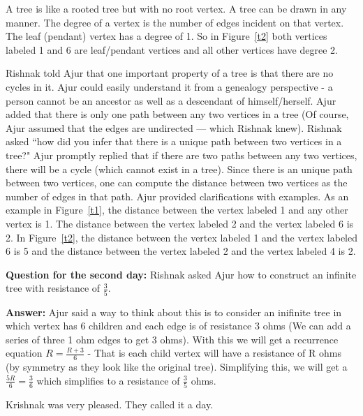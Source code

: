 A tree is like a rooted tree but with no root vertex. A tree can be drawn in any manner. The degree of a vertex is the number of edges incident on that vertex. The leaf (pendant) vertex has a degree of 1. So in Figure~\ref{t2} both vertices labeled 1 and 6 are leaf/pendant vertices and all other vertices have degree 2. 

Rishnak told Ajur that one important property of a tree is that there are no cycles in it. Ajur could easily understand it from a genealogy perspective - a person cannot be an ancestor as well as a descendant of himself/herself.  Ajur added that there is only one path between any two vertices in a tree (Of course, Ajur assumed that the edges are undirected --- which Rishnak knew). Rishnak asked ``how did you infer that there is a unique path between two vertices in a tree?" Ajur promptly replied that if there are two paths between any two vertices, there will be a cycle (which cannot exist in a tree). Since there is an unique path between two vertices, one can compute the distance between two vertices as the number of edges in that path. Ajur provided clarifications with examples.  As an example in Figure~\ref{t1}, the distance between the vertex labeled 1 and any other vertex is 1. The distance between the vertex labeled 2 and the vertex labeled 6 is 2. In Figure~\ref{t2}, the distance between the vertex labeled 1 and the vertex labeled 6 is 5 and the distance between the vertex labeled 2 and the vertex labeled 4 is 2.

\textbf{Question for the second day:} Rishnak asked Ajur how to construct an infinite tree with resistance of $\frac{3}{5}$.

\textbf{Answer:} Ajur said a way to think about this is to consider an inifinite tree in which vertex has 6 children and each edge is of resistance 3 ohms (We can add a series of three 1 ohm edges to get 3 ohms).
With this we will get a recurrence equation $R=\frac{R+3}{6}$ - That is each child vertex will have a resistance of R ohms (by symmetry as they look like the original tree). Simplifying this, we will get a $\frac{5R}{6}=\frac{3}{6}$ which simplifies to a resistance of $\frac{3}{5}$ ohms.

Krishnak was very pleased. They called it a day.